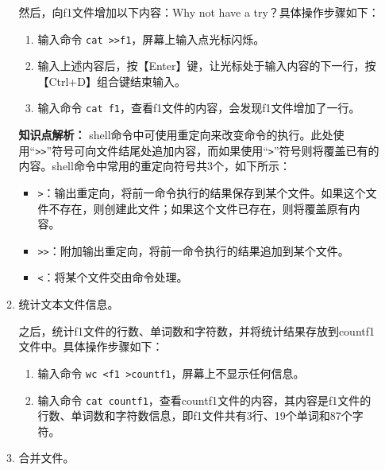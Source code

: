 \begin{enumerate}
\begin{enumerate}
然后，向f1文件增加以下内容：Why not have a try？具体操作步骤如下：
    \begin{enumerate}
      \item 输入命令 \verb|cat >>f1|，屏幕上输入点光标闪烁。
      \item 输入上述内容后，按【Enter】键，让光标处于输入内容的下一行，按【Ctrl+D】组合键结束输入。
      \item 输入命令 \verb|cat f1|，查看f1文件的内容，会发现f1文件增加了一行。
    \end{enumerate}
    \textbf{知识点解析：}
    shell命令中可使用重定向来改变命令的执行。此处使用“\verb|>>|”符号可向文件结尾处追加内容，而如果使用“\verb|>|”符号则将覆盖已有的内容。shell命令中常用的重定向符号共3个，如下所示：
    \begin{itemize}
      \item \verb|>|：输出重定向，将前一命令执行的结果保存到某个文件。如果这个文件不存在，则创建此文件；如果这个文件已存在，则将覆盖原有内容。
      \item \verb|>>|：附加输出重定向，将前一命令执行的结果追加到某个文件。
      \item \verb|<|：将某个文件交由命令处理。
    \end{itemize}
  \item 统计文本文件信息。

    之后，统计f1文件的行数、单词数和字符数，并将统计结果存放到countf1文件中。具体操作步骤如下：
    \begin{enumerate}
      \item 输入命令 \verb|wc <f1 >countf1|，屏幕上不显示任何信息。
      \item 输入命令 \verb|cat countf1|，查看countf1文件的内容，其内容是f1文件的行数、单词数和字符数信息，即f1文件共有3行、19个单词和87个字符。
    \end{enumerate}
  \item 合并文件。


\end{enumerate}
\end{enumerate}

